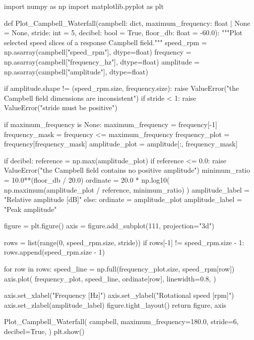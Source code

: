 \begin{python}
import numpy as np
import matplotlib.pyplot as plt


def Plot_Campbell_Waterfall(campbell: dict,
                            maximum_frequency: float | None = None,
                            stride: int = 5,
                            decibel: bool = True,
                            floor_db: float = -60.0):
    """Plot selected speed slices of a response Campbell field."""
    speed_rpm = np.asarray(campbell["speed_rpm"], dtype=float)
    frequency = np.asarray(campbell["frequency_hz"], dtype=float)
    amplitude = np.asarray(campbell["amplitude"], dtype=float)

    if amplitude.shape != (speed_rpm.size, frequency.size):
        raise ValueError("the Campbell field dimensions are inconsistent")
    if stride < 1:
        raise ValueError("stride must be positive")

    if maximum_frequency is None:
        maximum_frequency = frequency[-1]
    frequency_mask = frequency <= maximum_frequency
    frequency_plot = frequency[frequency_mask]
    amplitude_plot = amplitude[:, frequency_mask]

    if decibel:
        reference = np.max(amplitude_plot)
        if reference <= 0.0:
            raise ValueError("the Campbell field contains no positive amplitude")
        minimum_ratio = 10.0**(floor_db / 20.0)
        ordinate = 20.0 * np.log10(
            np.maximum(amplitude_plot / reference, minimum_ratio)
        )
        amplitude_label = "Relative amplitude [dB]"
    else:
        ordinate = amplitude_plot
        amplitude_label = "Peak amplitude"

    figure = plt.figure()
    axis = figure.add_subplot(111, projection="3d")

    rows = list(range(0, speed_rpm.size, stride))
    if rows[-1] != speed_rpm.size - 1:
        rows.append(speed_rpm.size - 1)

    for row in rows:
        speed_line = np.full(frequency_plot.size, speed_rpm[row])
        axis.plot(
            frequency_plot,
            speed_line,
            ordinate[row],
            linewidth=0.8,
        )

    axis.set_xlabel("Frequency [Hz]")
    axis.set_ylabel("Rotational speed [rpm]")
    axis.set_zlabel(amplitude_label)
    figure.tight_layout()
    return figure, axis


Plot_Campbell_Waterfall(
    campbell,
    maximum_frequency=180.0,
    stride=6,
    decibel=True,
)
plt.show()
\end{python}

